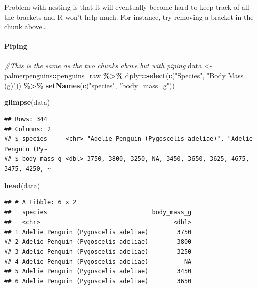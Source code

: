 \documentclass[
]{article}
\newenvironment{Shaded}{\begin{snugshade}}{\end{snugshade}}
\newcommand{\CommentTok}[1]{\textcolor[rgb]{0.56,0.35,0.01}{\textit{#1}}}
\newcommand{\FunctionTok}[1]{\textcolor[rgb]{0.13,0.29,0.53}{\textbf{#1}}}
\newcommand{\NormalTok}[1]{#1}
\newcommand{\OtherTok}[1]{\textcolor[rgb]{0.56,0.35,0.01}{#1}}
\newcommand{\SpecialCharTok}[1]{\textcolor[rgb]{0.81,0.36,0.00}{\textbf{#1}}}
\newcommand{\StringTok}[1]{\textcolor[rgb]{0.31,0.60,0.02}{#1}}
\begin{document}
Problem with nesting is that it will eventually become hard to keep
track of all the brackets and R won't help much. For instance, try
removing a bracket in the chunk above\ldots{}

\hypertarget{piping}{%
\paragraph{Piping}\label{piping}}

\begin{Shaded}
\begin{Highlighting}[]
\CommentTok{\#This is the same as the two chunks above but with piping}
\NormalTok{data }\OtherTok{\textless{}{-}}\NormalTok{ palmerpenguins}\SpecialCharTok{::}\NormalTok{penguins\_raw }\SpecialCharTok{\%\textgreater{}\%} 
\NormalTok{  dplyr}\SpecialCharTok{::}\FunctionTok{select}\NormalTok{(}\FunctionTok{c}\NormalTok{(}\StringTok{"Species"}\NormalTok{, }\StringTok{"Body Mass (g)"}\NormalTok{)) }\SpecialCharTok{\%\textgreater{}\%}
  \FunctionTok{setNames}\NormalTok{(}\FunctionTok{c}\NormalTok{(}\StringTok{"species"}\NormalTok{, }\StringTok{"body\_mass\_g"}\NormalTok{))}


\FunctionTok{glimpse}\NormalTok{(data)}
\end{Highlighting}
\end{Shaded}

\begin{verbatim}
## Rows: 344
## Columns: 2
## $ species     <chr> "Adelie Penguin (Pygoscelis adeliae)", "Adelie Penguin (Py~
## $ body_mass_g <dbl> 3750, 3800, 3250, NA, 3450, 3650, 3625, 4675, 3475, 4250, ~
\end{verbatim}

\begin{Shaded}
\begin{Highlighting}[]
\FunctionTok{head}\NormalTok{(data)}
\end{Highlighting}
\end{Shaded}

\begin{verbatim}
## # A tibble: 6 x 2
##   species                             body_mass_g
##   <chr>                                     <dbl>
## 1 Adelie Penguin (Pygoscelis adeliae)        3750
## 2 Adelie Penguin (Pygoscelis adeliae)        3800
## 3 Adelie Penguin (Pygoscelis adeliae)        3250
## 4 Adelie Penguin (Pygoscelis adeliae)          NA
## 5 Adelie Penguin (Pygoscelis adeliae)        3450
## 6 Adelie Penguin (Pygoscelis adeliae)        3650
\end{verbatim}
\end{document}
